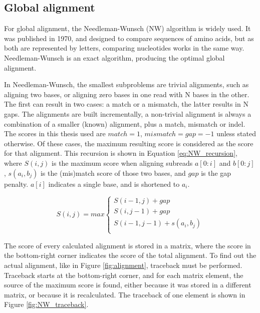 \documentclass[../main/thesis.tex]{subfiles}
\begin{document}
\subsection{Global alignment}
For global alignment, the Needleman-Wunsch (NW) algorithm \cite{NeedlemanWunsch} is widely used.
It was published in 1970, and designed to compare sequences of amino acids, but as both are represented by letters, comparing nucleotides works in the same way.
Needleman-Wunsch is an exact algorithm, producing the optimal global alignment.

In Needleman-Wunsch, the smallest subproblems are trivial alignments, such as aligning two bases, or aligning zero bases in one read with N bases in the other.
The first can result in two cases: a match or a mismatch, the latter results in N gaps.
The alignments are built incrementally, a non-trivial alignment is always a combination of a smaller (known) alignment, plus a match, mismatch or indel.
The scores in this thesis used are $match = 1$, $mismatch = gap = -1$ unless stated otherwise.
Of these cases, the maximum resulting score is considered as the score for that alignment.
This recursion is shown in Equation \ref{eq:NW_recursion}, where $S(i,j)$ is the maximum score when aligning subreads $a[0:i]$ and $b[0:j]$, $s(a_i,b_j)$ is the (mis)match score of those two bases, and $gap$ is the gap penalty.
$a[i]$ indicates a single base, and is shortened to $a_i$.

\begin{equation}
S(i,j) = max
\begin{cases}
S(i-1,j) + gap \\
S(i,j-1) + gap \\
S(i-1,j-1) + s(a_i,b_j) \\
\end{cases}
\label{eq:NW_recursion}
\end{equation}

The score of every calculated alignment is stored in a matrix, where the score in the bottom-right corner indicates the score of the total alignment.
To find out the actual alignment, like in Figure \ref{fig:alignment}, traceback must be performed.
Traceback starts at the bottom-right corner, and for each matrix element, the source of the maximum score is found, either because it was stored in a different matrix, or because it is recalculated.
The traceback of one element is shown in Figure \ref{fig:NW_traceback}.

\end{document}
